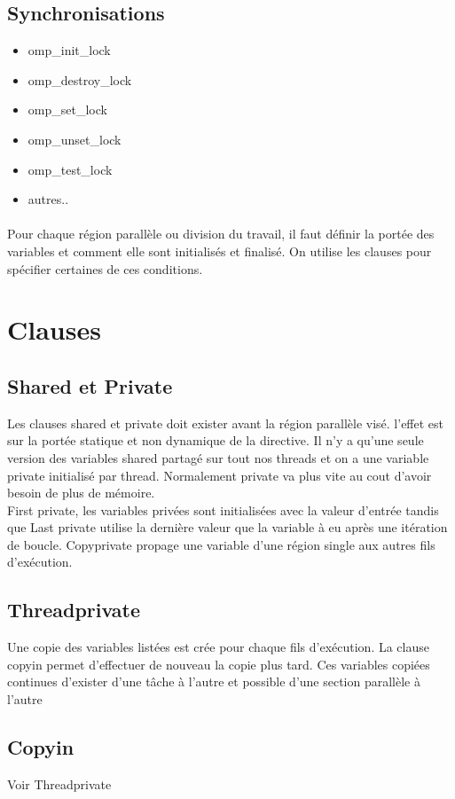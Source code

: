 \documentclass[oneside]{book}
\begin{document}
\subsection{Synchronisations}
\begin{itemize}
\item omp\_init\_lock
\item omp\_destroy\_lock
\item omp\_set\_lock
\item omp\_unset\_lock
\item omp\_test\_lock
\item autres..
\end{itemize}
\paragraph{} Pour chaque région parallèle ou division du travail, il faut définir la portée des variables et comment elle sont initialisés et finalisé. On utilise les clauses pour spécifier certaines de ces conditions.
\section{Clauses}
\subsection{Shared et Private}
Les clauses shared et private doit exister avant la région parallèle visé. l'effet est sur la portée statique et non dynamique de la directive. Il n'y a qu'une seule version des variables shared partagé sur tout nos threads et on a une variable private initialisé par thread. Normalement private va plus vite au cout d'avoir besoin de plus de mémoire. \\

First private, les variables privées sont initialisées avec la valeur d'entrée tandis que Last private utilise la dernière valeur que la variable à eu après une itération de boucle. Copyprivate propage une variable d'une région single aux autres fils d'exécution.
\subsection{Threadprivate}
Une copie des variables listées est crée pour chaque fils d'exécution. La clause copyin permet d'effectuer de nouveau la copie plus tard. Ces variables copiées continues d'exister d'une tâche à l'autre et possible d'une section parallèle à l'autre
\subsection{Copyin}
Voir Threadprivate
\end{document}
